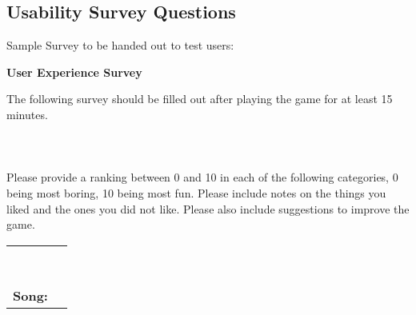 \documentclass[12pt, titlepage]{article}
\begin{document}
\subsection{Usability Survey Questions}
Sample Survey to be handed out to test users:
\begin{mdframed}[linewidth=1pt]
\begin{center}
{\bf \large User Experience Survey}\\[\baselineskip]
\end{center}
\noindent The following survey should be filled out after playing the game for at least 15 minutes.\\
\\
\\
\\
\noindent Please provide a ranking between 0 and 10 in each of the following categories, 0 being most boring, 10 being most fun.  Please include notes on the things you liked and the ones you did not like. Please also include suggestions to improve the game.\\[\baselineskip]
\noindent \begin{tabularx}{\textwidth}{@{}p{3.5cm}X@{}}
\noindent {\bf Entertainment:}\\
\\
\noindent {\bf Difficulty:}\\
\\
\noindent {\bf Appearance:}\\
\\
\noindent {\bf Sounds:}\\
\\
{\bf Song:} & \\[5\baselineskip]
\end{tabularx}
\end{mdframed}
\end{document}
